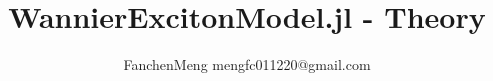 \documentclass[11pt, a4paper, oneside, final]{article}
\title{WannierExcitonModel.jl - Theory}
\author{FanchenMeng mengfc011220@gmail.com}
\begin{document}
\maketitle

\tableofcontents

\newpage

\newpage

\newpage

\newpage





\newpage
\appendix


\newpage




\nocite{*} %
\end{document}

